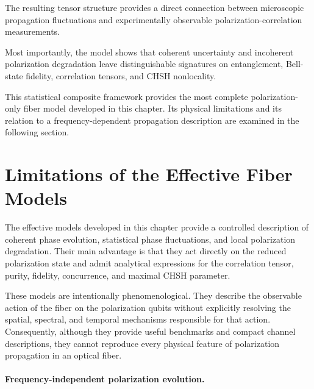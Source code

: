 \medskip

The resulting tensor structure provides a direct connection between microscopic propagation fluctuations and experimentally observable polarization-correlation measurements.

\medskip

Most importantly, the model shows that coherent uncertainty and incoherent polarization degradation leave distinguishable signatures on entanglement, Bell-state fidelity, correlation tensors, and CHSH nonlocality.

\medskip

This statistical composite framework provides the most complete polarization-only fiber model developed in this chapter. Its physical limitations and its relation to a frequency-dependent propagation description are examined in the following section.


\section{Limitations of the Effective Fiber Models}
\label{sec:limitations_effective_fiber_models}

The effective models developed in this chapter provide a controlled description of coherent phase evolution, statistical phase fluctuations, and local polarization degradation. Their main advantage is that they act directly on the reduced polarization state and admit analytical expressions for the correlation tensor, purity, fidelity, concurrence, and maximal CHSH parameter.

\medskip

These models are intentionally phenomenological. They describe the observable action of the fiber on the polarization qubits without explicitly resolving the spatial, spectral, and temporal mechanisms responsible for that action. Consequently, although they provide useful benchmarks and compact channel descriptions, they cannot reproduce every physical feature of polarization propagation in an optical fiber.

\medskip

\paragraph{Frequency-independent polarization evolution.}

